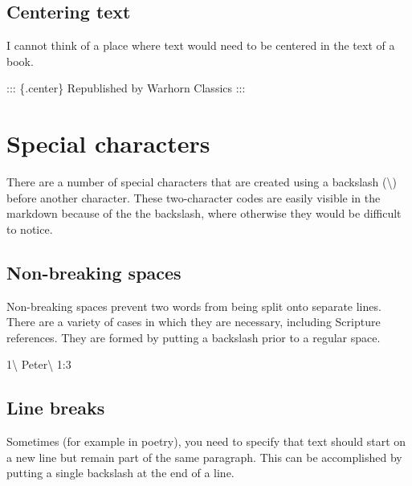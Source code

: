 \documentclass[
]{book}
\newenvironment{Shaded}{\begin{snugshade}}{\end{snugshade}}
\newcommand{\NormalTok}[1]{#1}
\begin{document}
\hypertarget{centering-text}{%
\subsection{Centering text}\label{centering-text}}

I cannot think of a place where text would need to be centered in the text of a book.

\begin{Shaded}
\begin{Highlighting}[]
\NormalTok{::: \{.center\}}
\NormalTok{Republished by Warhorn Classics}
\NormalTok{:::}
\end{Highlighting}
\end{Shaded}

\hypertarget{special-characters}{%
\section{Special characters}\label{special-characters}}

There are a number of special characters that are created using a backslash (\textbackslash) before another character. These two-character codes are easily visible in the markdown because of the the backslash, where otherwise they would be difficult to notice.

\hypertarget{non-breaking-spaces}{%
\subsection{Non-breaking spaces}\label{non-breaking-spaces}}

Non-breaking spaces prevent two words from being split onto separate lines. There are a variety of cases in which they are necessary, including Scripture references. They are formed by putting a backslash prior to a regular space.

\begin{Shaded}
\begin{Highlighting}[]
\NormalTok{1\textbackslash{} Peter\textbackslash{} 1:3 }
\end{Highlighting}
\end{Shaded}

\hypertarget{line-breaks}{%
\subsection{Line breaks}\label{line-breaks}}

Sometimes (for example in poetry), you need to specify that text should start on a new line but remain part of the same paragraph. This can be accomplished by putting a single backslash at the end of a line.
\end{document}
